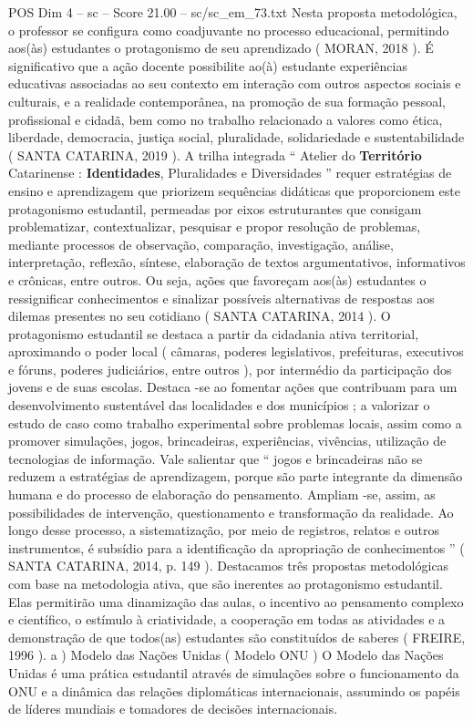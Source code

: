 \begin{textsample}{POS Dim 4 – sc – Score 21.00 – sc/sc\_em\_73.txt}
Nesta proposta metodológica, o professor se configura como coadjuvante no processo educacional, permitindo aos(às) estudantes o protagonismo de seu aprendizado ( MORAN, 2018 ).
É significativo que a ação docente possibilite ao(à) estudante experiências educativas associadas ao seu contexto em interação com outros aspectos sociais e culturais, e a realidade contemporânea, na promoção de sua formação pessoal, profissional e cidadã, bem como no trabalho relacionado a valores como ética, liberdade, democracia, justiça social, pluralidade, solidariedade e sustentabilidade ( SANTA CATARINA, 2019 ).
A trilha integrada “ Atelier do \textbf{Território} Catarinense : \textbf{Identidades}, Pluralidades e Diversidades ” requer estratégias de ensino e aprendizagem que priorizem sequências didáticas que proporcionem este protagonismo estudantil, permeadas por eixos estruturantes que consigam problematizar, contextualizar, pesquisar e propor resolução de problemas, mediante processos de observação, comparação, investigação, análise, interpretação, reflexão, síntese, elaboração de textos argumentativos, informativos e crônicas, entre outros.
Ou seja, ações que favoreçam aos(às) estudantes o ressignificar conhecimentos e sinalizar possíveis alternativas de respostas aos dilemas presentes no seu cotidiano ( SANTA CATARINA, 2014 ).
O protagonismo estudantil se destaca a partir da cidadania ativa territorial, aproximando o poder local ( câmaras, poderes legislativos, prefeituras, executivos e fóruns, poderes judiciários, entre outros ), por intermédio da participação dos jovens e de suas escolas.
Destaca -se ao fomentar ações que contribuam para um desenvolvimento sustentável das localidades e dos municípios ; a valorizar o estudo de caso como trabalho experimental sobre problemas locais, assim como a promover simulações, jogos, brincadeiras, experiências, vivências, utilização de tecnologias de informação.
Vale salientar que “ jogos e brincadeiras não se reduzem a estratégias de aprendizagem, porque são parte integrante da dimensão humana e do processo de elaboração do pensamento.
Ampliam -se, assim, as possibilidades de intervenção, questionamento e transformação da realidade.
Ao longo desse processo, a sistematização, por meio de registros, relatos e outros instrumentos, é subsídio para a identificação da apropriação de conhecimentos ” ( SANTA CATARINA, 2014, p. 149 ).
Destacamos três propostas metodológicas com base na metodologia ativa, que são inerentes ao protagonismo estudantil.
Elas permitirão uma dinamização das aulas, o incentivo ao pensamento complexo e científico, o estímulo à criatividade, a cooperação em todas as atividades e a demonstração de que todos(as) estudantes são constituídos de saberes ( FREIRE, 1996 ). a ) Modelo das Nações Unidas ( Modelo ONU ) O Modelo das Nações Unidas é uma prática estudantil através de simulações sobre o funcionamento da ONU e a dinâmica das relações diplomáticas internacionais, assumindo os papéis de líderes mundiais e tomadores de decisões internacionais.

\end{textsample}
